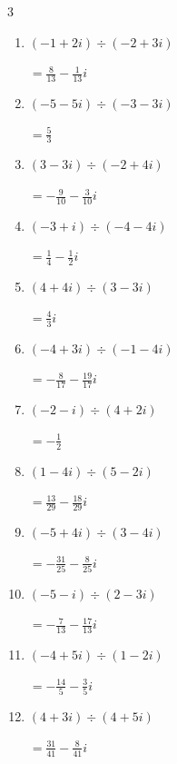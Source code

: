 \begin{multicols}{3}
\begin{enumerate}
  \item $\displaystyle (-1+2i)\div(-2+3i)$

        $\displaystyle =\frac{8}{13}-\frac{1}{13}i$

  \item $\displaystyle (-5-5i)\div(-3-3i)$

        $\displaystyle =\frac{5}{3}$

  \item $\displaystyle (3-3i)\div(-2+4i)$

        $\displaystyle =-\frac{9}{10}-\frac{3}{10}i$

  \item $\displaystyle (-3+i)\div(-4-4i)$

        $\displaystyle =\frac{1}{4}-\frac{1}{2}i$

  \item $\displaystyle (4+4i)\div(3-3i)$

        $\displaystyle =\frac{4}{3}i$

  \item $\displaystyle (-4+3i)\div(-1-4i)$

        $\displaystyle =-\frac{8}{17}-\frac{19}{17}i$

  \item $\displaystyle (-2-i)\div(4+2i)$

        $\displaystyle =-\frac{1}{2}$

  \item $\displaystyle (1-4i)\div(5-2i)$

        $\displaystyle =\frac{13}{29}-\frac{18}{29}i$

  \item $\displaystyle (-5+4i)\div(3-4i)$

        $\displaystyle =-\frac{31}{25}-\frac{8}{25}i$

\columnbreak %

  \item $\displaystyle (-5-i)\div(2-3i)$

        $\displaystyle =-\frac{7}{13}-\frac{17}{13}i$

  \item $\displaystyle (-4+5i)\div(1-2i)$

        $\displaystyle =-\frac{14}{5}-\frac{3}{5}i$

  \item $\displaystyle (4+3i)\div(4+5i)$

        $\displaystyle =\frac{31}{41}-\frac{8}{41}i$


\end{enumerate}
\end{multicols}
